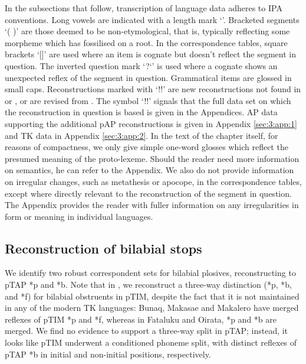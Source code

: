 In the subsections that follow, transcription of language data adheres to IPA conventions. Long vowels are indicated with a length mark `{\textlengthmark}'. Bracketed segments `( )' are those deemed to be non-etymological, that is, typically reflecting some morpheme which has fossilised on a root. In the correspondence tables, square brackets `[]' are used where an item is cognate but doesn't reflect the segment in question. The inverted question mark `?`' is used where a cognate shows an unexpected reflex of the segment in question. Grammatical items are glossed in small caps. Reconstructions marked with `!!' are new reconstructions not found in \citet{HoltonEtAl2012} or \citet{SchapperEtAl2012}, or are revised from \citet{HoltonEtAl2012}. The symbol `!!' signals that the full data set on which the reconstruction in question is based is given in the Appendices. AP data supporting the additional pAP reconstructions is given in Appendix \ref{sec:3:app:1} and TK data in Appendix \ref{sec:3:app:2}. In the text of the chapter itself, for reasons of compactness, we only give simple one-word glosses which reflect the presumed meaning of the proto-lexeme. Should the reader need more information on semantics, he can refer to the Appendix. We also do not provide information on irregular changes, such as metathesis or apocope, in the correspondence tables, except where directly relevant to the reconstruction of the segment in question. The Appendix provides the reader with fuller information on any irregularities in form or meaning in individual languages. 

\subsection{Reconstruction of bilabial stops}
We identify two robust correspondent sets for bilabial plosives, reconstructing to pTAP *p and *b. Note that in \citet{SchapperEtAl2012}, we reconstruct a three-way distinction (*p, *b, and *f) for bilabial obstruents in pTIM, despite the fact that it is not maintained in any of the modern TK languages: Bunaq, Makasae and Makalero have merged reflexes of pTIM *p and *f, whereas in Fataluku and Oirata, *p and *b are merged. We find no evidence to support a three-way split in pTAP; instead, it looks like pTIM underwent a conditioned phoneme split, with distinct reflexes of pTAP *b in initial and non-initial positions, respectively. 

